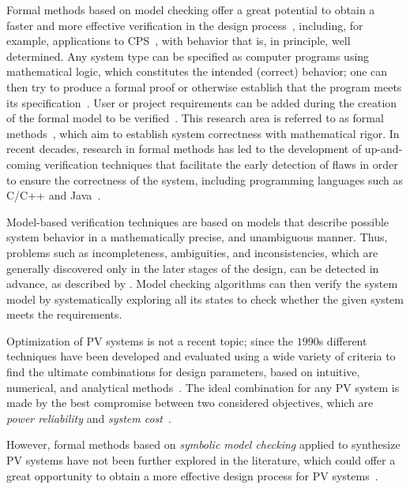 Formal methods based on model checking offer a great potential to obtain a faster and more effective verification in the design process~\cite{ClarkeHV18}, including, for example, applications to CPS~\cite{Abateetal2017,AbateBCCDKK17,Bessa,ChavesBCKF17}, with behavior that is, in principle, well determined. 
Any system type can be specified as computer programs using mathematical logic, which constitutes the intended (correct) behavior; one can then try to produce a formal proof or otherwise establish that the program meets its specification~\cite{DBLP:journals/sttt/GadelhaIC17}. User or project requirements can be added during the creation of the formal model to be verified~\cite{Trindade,TrindadeDJISC17}. 
%
This research area is referred to as formal methods~\cite{Clarkeetal}, which aim to establish system correctness with mathematical rigor. 
In recent decades, research in formal methods has led to the development of up-and-coming verification techniques that facilitate the early detection of flaws in order to ensure the correctness of the system, including programming languages such as C/C++ and Java~\cite{esbmc2018,RamalhoFSMC013,CordeiroKKST18}. 

Model-based verification techniques are based on models that describe possible system behavior in a mathematically precise, and unambiguous manner. Thus, problems such as incompleteness, ambiguities, and inconsistencies, which are generally discovered only in the later stages of the design, can be detected in advance, as described by \cite{Trindade,TrindadeDJISC17}. 
Model checking algorithms can then verify the system model by systematically exploring all its states to check whether the given system meets the requirements.
%
%

Optimization of PV systems is not a recent topic; since the $1990$s different techniques have been developed and evaluated using a wide variety of criteria to find the ultimate combinations for design parameters, based on intuitive, numerical, and analytical methods~\cite{Applasamy2011}. The ideal combination for  any PV system is made by the best compromise between two considered objectives, which are \textit{power reliability} and \textit{system cost}~\cite{Alsadi2018}.
 
However, formal methods based on \textit{symbolic model checking} applied to synthesize PV systems have not been further explored in the literature, which could offer a great opportunity to obtain a more effective design process for PV systems~\cite{ClarkeHV18}.

